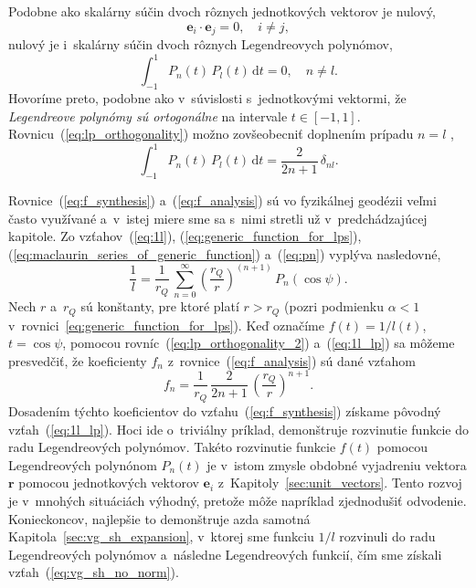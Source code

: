 \documentclass[a4paper, 12pt]{book}
\newcommand{\diff}{\mathrm d}
\let\vec\mathbf
\begin{document}
Podobne ako skalárny súčin dvoch rôznych jednotkových vektorov je nulový,
%
\begin{equation}
\label{eq:ei_orthogonality}
\vec e_i \cdot \vec e_j = 0{,} \quad i \neq j{,}
\end{equation}
%
nulový je i~skalárny súčin dvoch rôznych Legendreovych polynómov,
%
\begin{equation}
\label{eq:lp_orthogonality}
\int_{-1}^1 P_n(t) \, P_l(t) \, \diff t = 0{,} \quad n \neq l{.}
\end{equation}
%
Hovoríme preto, podobne ako v~súvislosti s~jednotkovými vektormi, že
\emph{Legendreove polynómy sú ortogonálne} na intervale $t \in [-1, 1].$
Rovnicu~(\ref{eq:lp_orthogonality}) možno zovšeobecniť doplnením prípadu $n
= l$ \citep[napríklad][]{Hobson},
%
\begin{equation}
\label{eq:lp_orthogonality_2}
\int_{-1}^1 P_n(t) \, P_l(t) \, \diff t = \frac{2}{2n + 1} \, \delta_{nl}{.}
\end{equation}

Rovnice~(\ref{eq:f_synthesis}) a~(\ref{eq:f_analysis}) sú vo fyzikálnej
geodézii veľmi často využívané a~v~istej miere sme sa s~nimi stretli už
v~predchádzajúcej kapitole.  Zo vzťahov~(\ref{eq:1l}),
(\ref{eq:generic_function_for_lps}),
(\ref{eq:maclaurin_series_of_generic_function}) a~(\ref{eq:pn}) vyplýva
nasledovné,
%
\begin{equation}
\label{eq:1l_lp}
\frac{1}{l} = \frac{1}{r_Q} \, \sum_{n = 0}^\infty \left( \frac{r_Q}{r}
\right)^{(n + 1)} \, P_n(\cos\psi){.}
\end{equation}
%
Nech $r$ a~$r_Q$ sú konštanty, pre ktoré platí $r > r_Q$ (pozri podmienku
$\alpha < 1$ v~rovnici~\ref{eq:generic_function_for_lps}).  Keď označíme $f(t)
= 1 \slash l(t)$, $t = \cos\psi$, pomocou rovníc~(\ref{eq:lp_orthogonality_2})
a~(\ref{eq:1l_lp}) sa môžeme presvedčiť, že koeficienty $f_n$
z~rovnice~(\ref{eq:f_analysis}) sú dané vzťahom
%
\begin{equation}
f_n = \frac{1}{r_Q} \, \frac{2}{2n + 1} \, \left( \frac{r_Q}{r} \right)^{n
+ 1}{.}
\end{equation}
%
Dosadením týchto koeficientov do vzťahu~(\ref{eq:f_synthesis}) získame pôvodný
vzťah~(\ref{eq:1l_lp}).  Hoci ide o~triviálny príklad, demonštruje rozvinutie
funkcie do radu Legendreových polynómov.  Takéto rozvinutie funkcie $f(t)$
pomocou Legendreových polynónom $P_n(t)$ je v~istom zmysle obdobné vyjadreniu
vektora $\vec r$ pomocou jednotkových vektorov $\vec e_i$
z~Kapitoly~\ref{sec:unit_vectors}.  Tento rozvoj je v~mnohých situáciách
výhodný, pretože môže napríklad zjednodušiť odvodenie.  Konieckoncov, najlepšie
to demonštruje azda samotná Kapitola~\ref{sec:vg_sh_expansion}, v~ktorej sme
funkciu $1 \slash l$ rozvinuli do radu Legendreových polynómov a~následne
Legendreových funkcií, čím sme získali vzťah~(\ref{eq:vg_sh_no_norm}).
\end{document}
